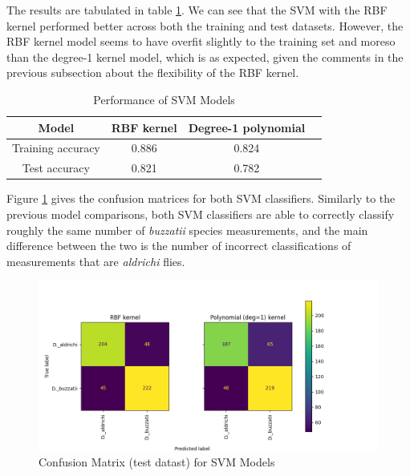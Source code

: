 The results are tabulated in table \ref{svmperformance}. We can see that the SVM with the RBF kernel performed better across both the training and test datasets. However, the RBF kernel model seems to have overfit slightly to the training set and moreso than the degree-1 kernel model, which is as expected, given the comments in the previous subsection about the flexibility of the RBF kernel.

\begin{table}[!ht]
\begin{center}
\begin{tabular}{|c|c|c|c|}
\hline
Model             & RBF kernel & Degree-1 polynomial \\ \hline
Training accuracy & 0.886      & 0.824               \\ \hline
Test accuracy     & 0.821      & 0.782               \\ \hline
\end{tabular}
\end{center}
\caption{Performance of SVM Models}
\label{svmperformance}
\end{table}

Figure \ref{svmcm} gives the confusion matrices for both SVM classifiers. Similarly to the previous model comparisons, both SVM classifiers are able to correctly classify roughly the same number of \textit{buzzatii} species measurements, and the main difference between the two is the number of incorrect classifications of measurements that are \textit{aldrichi} flies.

\begin{figure}[!ht]
\begin{center}
\includegraphics[width=\textwidth]{fig/cm_svm.png}
\end{center}
\caption{Confusion Matrix (test datast) for SVM Models}
\label{svmcm}
\end{figure}

